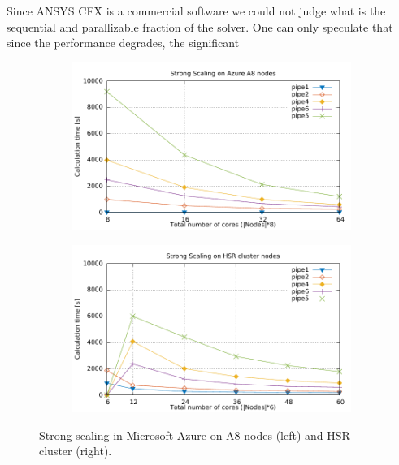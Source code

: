 \documentclass[3p,times]{elsarticle}
\begin{document}
Since ANSYS CFX is a commercial software we could not judge what is the sequential and parallizable fraction of the solver. One can only speculate that since the performance degrades, the significant 
\begin{figure}
\centering
\begin{subfigure}{.4\textwidth}
	\centering
	\includegraphics[width=\linewidth]{gplt-a8-strong-pipe}	
	\label{fig:strongA8}
\end{subfigure}
\begin{subfigure}{.4\textwidth}
	\centering
	\includegraphics[width=\linewidth]{gplt-hsr-strong-pipe}
	\label{fig:strongHSR}
\end{subfigure}

\caption{Strong scaling in Microsoft Azure on A8 nodes (left) and HSR cluster (right). }
\label{fig:strongHSR}
\end{figure}
\end{document}
